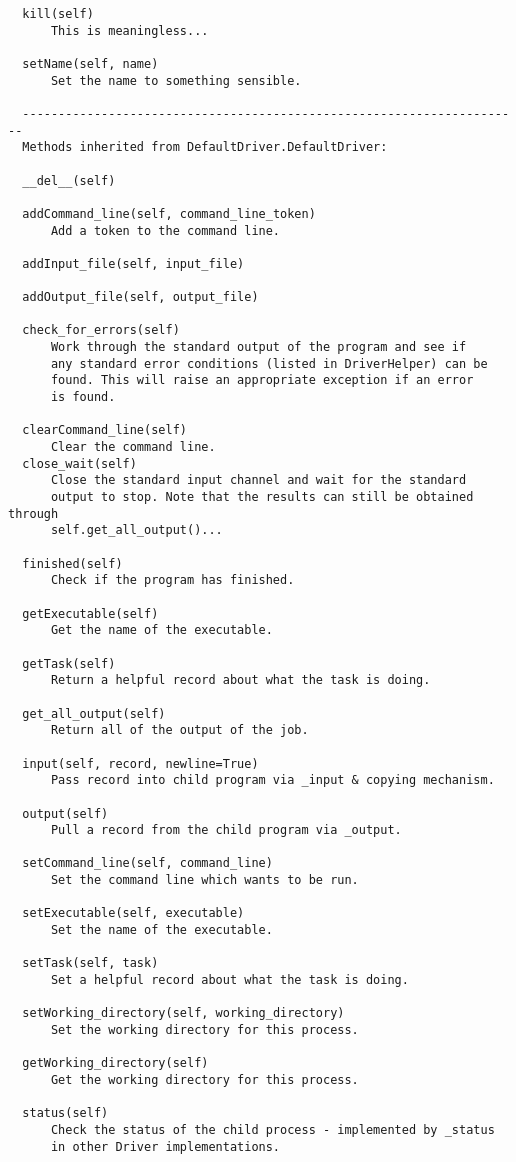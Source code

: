 \documentclass[a4paper, 11pt]{article}
\begin{document}
{\begin{verbatim}
  kill(self)
      This is meaningless...
  
  setName(self, name)
      Set the name to something sensible.
  
  ----------------------------------------------------------------------
  Methods inherited from DefaultDriver.DefaultDriver:
  
  __del__(self)
  
  addCommand_line(self, command_line_token)
      Add a token to the command line.
  
  addInput_file(self, input_file)
  
  addOutput_file(self, output_file)
  
  check_for_errors(self)
      Work through the standard output of the program and see if
      any standard error conditions (listed in DriverHelper) can be
      found. This will raise an appropriate exception if an error
      is found.
  
  clearCommand_line(self)
      Clear the command line.
  close_wait(self)
      Close the standard input channel and wait for the standard
      output to stop. Note that the results can still be obtained through
      self.get_all_output()...
  
  finished(self)
      Check if the program has finished.
  
  getExecutable(self)
      Get the name of the executable.
  
  getTask(self)
      Return a helpful record about what the task is doing.
  
  get_all_output(self)
      Return all of the output of the job.
  
  input(self, record, newline=True)
      Pass record into child program via _input & copying mechanism.
  
  output(self)
      Pull a record from the child program via _output.
  
  setCommand_line(self, command_line)
      Set the command line which wants to be run.
  
  setExecutable(self, executable)
      Set the name of the executable.
  
  setTask(self, task)
      Set a helpful record about what the task is doing.
  
  setWorking_directory(self, working_directory)
      Set the working directory for this process.

  getWorking_directory(self)
      Get the working directory for this process.
  
  status(self)
      Check the status of the child process - implemented by _status
      in other Driver implementations.
  

\end{verbatim}}
\end{document}
